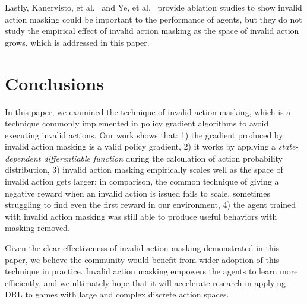 \documentclass[letterpaper]{article}
\begin{document}
Lastly, Kanervisto, et al.~\cite{kanervisto2020action} and Ye, et al.~\cite{ye2019mastering} provide ablation studies to show invalid action masking could be important to the performance of agents, but they do not study the empirical effect of invalid action masking as the space of invalid action grows, which is addressed in this paper.

\section{Conclusions}
In this paper, we examined the technique of invalid action masking, which is a technique commonly implemented in policy gradient algorithms to avoid executing invalid actions. Our work shows that: 1) the gradient produced by invalid action masking is a valid policy gradient, 2) it works by applying a \emph{state-dependent differentiable function} during the calculation of action probability distribution, 3) invalid action masking empirically scales well as the space of invalid action gets larger; in comparison, the common technique of giving a negative reward when an invalid action is issued fails to scale, sometimes struggling to find even the first reward in our environment, 4) the agent trained with invalid action masking was still able to produce useful behaviors with masking removed.

Given the clear effectiveness of invalid action masking demonstrated in this paper, we believe the community would benefit from wider adoption of this technique in practice.  Invalid action masking empowers the agents to learn more efficiently, and we ultimately hope that it will accelerate research in applying DRL to games with large and complex discrete action spaces.





\end{document}
